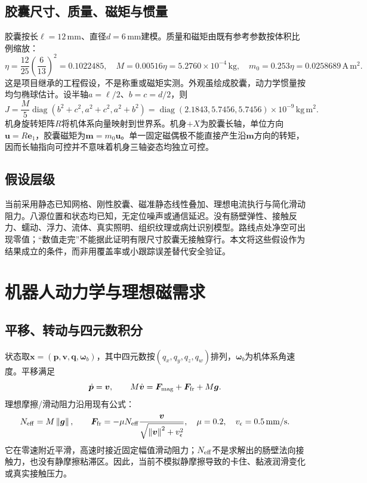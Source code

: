 \documentclass[UTF8,a4paper,zihao=5,fontset=windows]{ctexart}
\newcommand{\vect}[1]{\bm{#1}}
\newcommand{\norm}[1]{\left\lVert#1\right\rVert}
\newcommand{\diag}{\operatorname{diag}}
\newcommand{\unit}[1]{\,\mathrm{#1}}
\begin{document}
\subsection{胶囊尺寸、质量、磁矩与惯量}
胶囊按长$\ell=12\unit{mm}$、直径$d=6\unit{mm}$建模。质量和磁矩由既有参考参数按体积比例缩放：
\begin{equation}
\eta=\frac{12}{25}\left(\frac{6}{13}\right)^2=0.1022485,
\quad M=0.00516\eta=5.2760\times10^{-4}\unit{kg},
\quad m_0=0.253\eta=0.0258689\unit{A\,m^2}.
\label{eq:scaling}
\end{equation}
这是项目继承的工程假设，不是称重或磁矩实测。外观虽绘成胶囊，动力学惯量按均匀椭球估计。设半轴$a=\ell/2$、$b=c=d/2$，则
\begin{equation}
J=\frac{M}{5}\diag(b^2+c^2,a^2+c^2,a^2+b^2)
=\diag(2.1843,5.7456,5.7456)\times10^{-9}\unit{kg\,m^2}.
\label{eq:inertia}
\end{equation}
机身旋转矩阵$R$将机体系向量映射到世界系。机身$+X$为胶囊长轴，单位方向$\vect u=R\vect e_1$，胶囊磁矩为$\vect m=m_0\vect u$。单一固定磁偶极不能直接产生沿$\vect m$方向的转矩，因而长轴指向可控并不意味着机身三轴姿态均独立可控。

\subsection{假设层级}
当前采用静态已知网格、刚性胶囊、磁准静态线性叠加、理想电流执行与简化滑动阻力。八源位置和状态均已知，无定位噪声或通信延迟。没有肠壁弹性、接触反力、蠕动、浮力、流体、真实照明、组织纹理或病灶识别模型。路线点处净空可出现零值；“数值走完”不能据此证明有限尺寸胶囊无接触穿行。本文将这些假设作为结果成立的条件，而非用覆盖率或小跟踪误差替代安全验证。

\section{机器人动力学与理想磁需求}
\subsection{平移、转动与四元数积分}
状态取$\vect x=(\vect p,\vect v,\vect q,\vect\omega_b)$，其中四元数按$(q_x,q_y,q_z,q_w)$排列，$\vect\omega_b$为机体系角速度。平移满足
\begin{equation}
\dot{\vect p}=\vect v,\qquad M\dot{\vect v}=\vect F_{\rm mag}+\vect F_{\rm fr}+M\vect g.
\label{eq:translation}
\end{equation}
理想摩擦/滑动阻力沿用现有公式：
\begin{equation}
N_{\rm eff}=M\norm{\vect g},\qquad
\vect F_{\rm fr}=-\mu N_{\rm eff}\frac{\vect v}{\sqrt{\norm{\vect v}^2+v_\epsilon^2}},
\quad\mu=0.2,\quad v_\epsilon=0.5\unit{mm/s}.
\label{eq:friction}
\end{equation}
它在零速附近平滑，高速时接近固定幅值滑动阻力；$N_{\rm eff}$不是求解出的肠壁法向接触力，也没有静摩擦粘滞区。因此，当前不模拟静摩擦导致的卡住、黏液润滑变化或真实接触压力。
\end{document}
